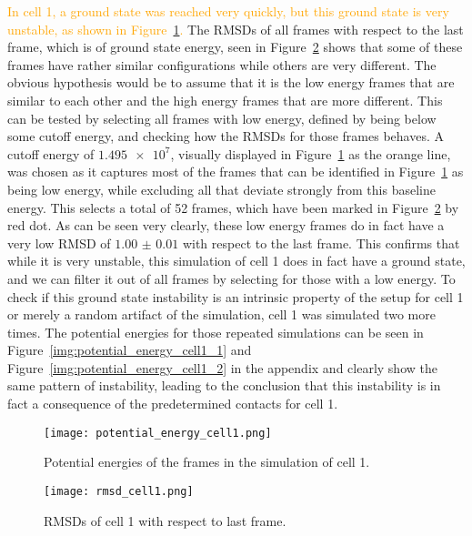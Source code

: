 \textcolor{orange}{In cell 1, a ground state was reached very quickly, but this ground state is very unstable, as shown in Figure~\ref{img:potential_energy_cell1}.} The RMSDs of all frames with respect to the last frame, which is of ground state energy, seen in Figure~\ref{img:rmsd_cell1} shows that some of these frames have rather similar configurations while others are very different. The obvious hypothesis would be to assume that it is the low energy frames that are similar to each other and the high energy frames that are more different. This can be tested by selecting all frames with low energy, defined by being below some cutoff energy, and checking how the RMSDs for those frames behaves. A cutoff energy of \(\num{1.495e7}\), visually displayed in Figure~\ref{img:potential_energy_cell1} as the orange line, was chosen as it captures most of the frames that can be identified in Figure~\ref{img:potential_energy_cell1} as being low energy, while excluding all that deviate strongly from this baseline energy. This selects a total of 52 frames, which have been marked in Figure~\ref{img:rmsd_cell1} by red dot. As can be seen very clearly, these low energy frames do in fact have a very low RMSD of \(\num{1.00(1)}\) with respect to the last frame. This confirms that while it is very unstable, this simulation of cell 1 does in fact have a ground state, and we can filter it out of all frames by selecting for those with a low energy. To check if this ground state instability is an intrinsic property of the setup for cell 1 or merely a random artifact of the simulation, cell 1 was simulated two more times. The potential energies for those repeated simulations can be seen in Figure~\ref{img:potential_energy_cell1_1} and Figure~\ref{img:potential_energy_cell1_2} in the appendix and clearly show the same pattern of instability, leading to the conclusion that this instability is in fact a consequence of the predetermined contacts for cell 1.

\begin{figure}[ht]
\centering
  \texttt{[image: potential\_energy\_cell1.png]}
  \caption{Potential energies of the frames in the simulation of cell 1.}
  \label{img:potential_energy_cell1}
\end{figure}

\begin{figure}[ht]
\centering
  \texttt{[image: rmsd\_cell1.png]}
  \caption{RMSDs of cell 1 with respect to last frame.}
  \label{img:rmsd_cell1}
\end{figure}

